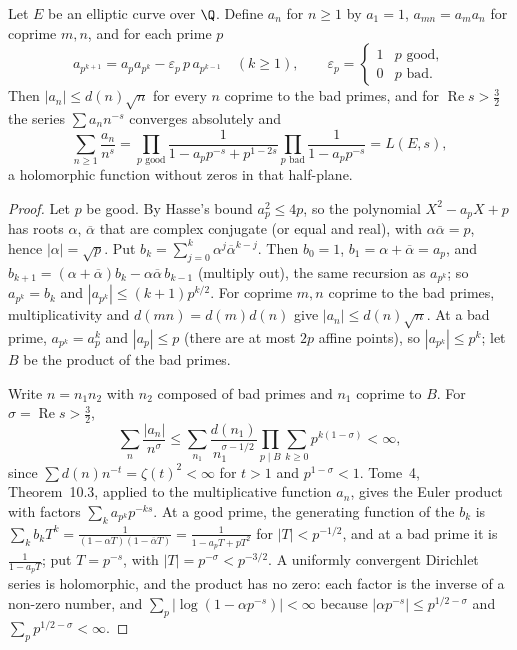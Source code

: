 \begin{proposition}\label{prop:eulerconv}
Let $E$ be an elliptic curve over $\Q$. Define $a_n$ for $n\ge1$ by $a_1=1$, $a_{mn}=a_ma_n$ for coprime $m,n$, and for each prime $p$
\[
a_{p^{k+1}}=a_pa_{p^k}-\varepsilon_p\,p\,a_{p^{k-1}}\quad(k\ge1),\qquad\varepsilon_p=\begin{cases}1&p\text{ good},\\0&p\text{ bad}.\end{cases}
\]
Then $|a_n|\le d(n)\sqrt n$ for every $n$ coprime to the bad primes, and for $\operatorname{Re}s>\frac32$ the series $\sum a_nn^{-s}$ converges absolutely and
\[
\sum_{n\ge1}\frac{a_n}{n^s}=\prod_{p\text{ good}}\frac1{1-a_pp^{-s}+p^{1-2s}}\prod_{p\text{ bad}}\frac1{1-a_pp^{-s}}=L(E,s),
\]
a holomorphic function without zeros in that half-plane.
\end{proposition}
\begin{proof}
Let $p$ be good. By Hasse's bound $a_p^2\le4p$, so the polynomial $X^2-a_pX+p$ has roots $\alpha$, $\overline\alpha$ that are complex conjugate (or equal and
real), with $\alpha\overline\alpha=p$, hence $|\alpha|=\sqrt p$. Put $b_k=\sum_{j=0}^k\alpha^j\overline\alpha^{k-j}$. Then $b_0=1$, $b_1=\alpha+\overline\alpha=a_p$,
and $b_{k+1}=(\alpha+\overline\alpha)b_k-\alpha\overline\alpha\,b_{k-1}$ (multiply out), the same recursion as $a_{p^k}$; so $a_{p^k}=b_k$ and $|a_{p^k}|\le(k+1)p^{k/2}$.
For coprime $m,n$ coprime to the bad primes, multiplicativity and $d(mn)=d(m)d(n)$ give $|a_n|\le d(n)\sqrt n$. At a bad prime, $a_{p^k}=a_p^k$ and
$|a_p|\le p$ (there are at most $2p$ affine points), so $|a_{p^k}|\le p^k$; let $B$ be the product of the bad primes.

Write $n=n_1n_2$ with $n_2$ composed of bad primes and $n_1$ coprime to $B$. For $\sigma=\operatorname{Re}s>\frac32$,
\[
\sum_n\frac{|a_n|}{n^\sigma}\le\sum_{n_1}\frac{d(n_1)}{n_1^{\sigma-1/2}}\prod_{p\mid B}\sum_{k\ge0}p^{k(1-\sigma)}<\infty,
\]
since $\sum d(n)n^{-t}=\zeta(t)^2<\infty$ for $t>1$ and $p^{1-\sigma}<1$. Tome~4, Theorem~10.3, applied to the multiplicative function $a_n$, gives the Euler
product with factors $\sum_ka_{p^k}p^{-ks}$. At a good prime, the generating function of the $b_k$ is
$\sum_kb_kT^k=\frac1{(1-\alpha T)(1-\overline\alpha T)}=\frac1{1-a_pT+pT^2}$ for $|T|<p^{-1/2}$, and at a bad prime it is $\frac1{1-a_pT}$; put $T=p^{-s}$,
with $|T|=p^{-\sigma}<p^{-3/2}$. A uniformly convergent Dirichlet series is holomorphic, and the product has no zero: each factor is the inverse of a
non-zero number, and $\sum_p|\log(1-\alpha p^{-s})|<\infty$ because $|\alpha p^{-s}|\le p^{1/2-\sigma}$ and $\sum_pp^{1/2-\sigma}<\infty$.
\end{proof}

